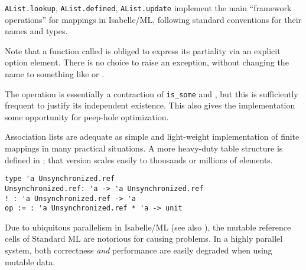 \begin{isabellebody}
\begin{isamarkuptext}
  \begin{description}

  \item \verb|AList.lookup|, \verb|AList.defined|, \verb|AList.update|
  implement the main ``framework operations'' for mappings in
  Isabelle/ML, following standard conventions for their names and
  types.

  Note that a function called  is obliged to express its
  partiality via an explicit option element.  There is no choice to
  raise an exception, without changing the name to something like
   or .

  The  operation is essentially a contraction of \verb|is_some| and , but this is sufficiently frequent to
  justify its independent existence.  This also gives the
  implementation some opportunity for peep-hole optimization.

  \end{description}

  Association lists are adequate as simple and light-weight
  implementation of finite mappings in many practical situations.  A
  more heavy-duty table structure is defined in \hyperlink{file.~~/src/Pure/General/table.ML}{\mbox{}}; that version scales easily to
  thousands or millions of elements.%
\end{isamarkuptext}%
\isamarkuptrue%
%
\isamarkuptrue%
%
\isadelimmlref
%
\endisadelimmlref
%
\isatagmlref
%
\begin{isamarkuptext}%
\begin{mldecls}
  \verb|type 'a Unsynchronized.ref| \\
  \verb|Unsynchronized.ref: 'a -> 'a Unsynchronized.ref| \\
  \verb|! : 'a Unsynchronized.ref -> 'a| \\
  \verb|op := : 'a Unsynchronized.ref * 'a -> unit| \\
  \end{mldecls}%
\end{isamarkuptext}%
\isamarkuptrue%
%
\endisatagmlref
{\isafoldmlref}%
%
\isadelimmlref
%
\endisadelimmlref
%
\begin{isamarkuptext}%
Due to ubiquitous parallelism in Isabelle/ML (see also
  ), the mutable reference cells of
  Standard ML are notorious for causing problems.  In a highly
  parallel system, both correctness \emph{and} performance are easily
  degraded when using mutable data.


\end{isamarkuptext}
\end{isabellebody}
